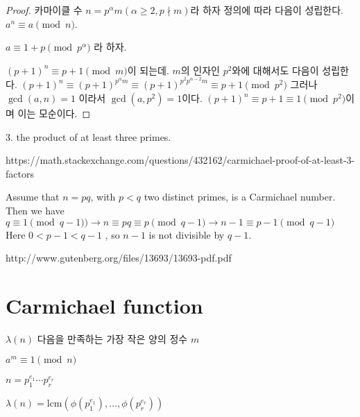 \begin{proof}
카마이클 수 $n = p^\alpha m( \alpha \ge 2 ,  p \nmid m )$라 하자
정의에 따라 다음이 성립한다. 
$a^{n} \equiv a \pmod{n}$.

$ a \equiv 1 + p \pmod{p^\alpha}$ 라 하자.

$(p+1)^{n} \equiv p+1 \pmod{m}$이 되는데. 
$m$의 인자인 $p^2$와에 대해서도 다음이 성립한다.
$(p+1)^{n} \equiv (p+1)^{p^\alpha m} \equiv (p+1)^{p^2 p^{\alpha-2} m}  \equiv p+1 \pmod{p^2}$
그러나 $\gcd(a,n) = 1$ 이라서 $\gcd(a, p^2) = 1$이다.
$(p+1)^{n} \equiv p+1  \equiv 1 \pmod{p^2}$이며 이는 모순이다.
\end{proof}



3. the product of at least three primes. 

https://math.stackexchange.com/questions/432162/carmichael-proof-of-at-least-3-factors


Assume that $n=pq$, with $p<q$ two distinct primes, is a Carmichael number. 
Then we have 
$q≡1 \pmod{q−1} )\rightarrow n \equiv pq \equiv p \pmod{q−1}  \rightarrow n−1 \equiv p−1 \pmod{q−1}$
Here $0 < p−1 < q−1$ , so $n−1$ is not divisible by $q−1$.


http://www.gutenberg.org/files/13693/13693-pdf.pdf




\section{Carmichael function}


$\lambda(n)$ 다음을 만족하는 가장 작은 양의 정수 $m$

$a^m \equiv 1 \pmod{n}$

$n = p_1^{e_1} \cdots p_r^{e_r}$

$\lambda(n) = \text{lcm}(\phi(p_1^{e_1}), \ldots,\phi(p_r^{e_r}))$



